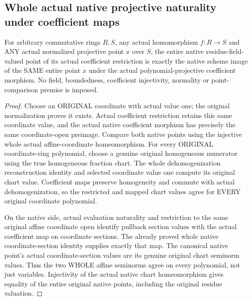\subsection{Whole actual native projective naturality under coefficient maps}

\begin{theorem}
\label{projective:actual-whole-native-coefficient-naturality}
\leanok
{}
For arbitrary commutative rings $R,S$, any actual homomorphism $f:R\to S$
and ANY actual normalized projective point $x$ over $S$, the entire native
residue-field-valued point of its actual coefficient restriction is exactly
the native scheme image of the SAME entire point $x$ under the actual
polynomial-projective coefficient morphism. No field, boundedness,
coefficient injectivity, normality or point-comparison premise is imposed.
\end{theorem}
\begin{proof}
Choose an ORIGINAL coordinate with actual value one; the original
normalization proves it exists. Actual coefficient restriction retains
this same coordinate value, and the actual native coefficient morphism
has precisely the same coordinate-open preimage. Compare both native
points using the injective whole actual affine-coordinate homeomorphism.
For every ORIGINAL coordinate-ring polynomial, choose a genuine original
homogeneous numerator using the true homogeneous fraction chart. The
whole dehomogenization reconstruction identity and selected coordinate
value one compute its original chart value. Coefficient maps preserve
homogeneity and commute with actual dehomogenization, so the restricted
and mapped chart values agree for EVERY original coordinate polynomial.

On the native side, actual evaluation naturality and restriction to the
same original affine coordinate open identify pullback section values
with the actual coefficient map on coordinate sections. The already
proved whole native coordinate-section identity supplies exactly that
map. The canonical native point's actual coordinate-section values are
its genuine original chart seminorm values. Thus the two WHOLE affine
seminorms agree on every polynomial, not just variables. Injectivity of
the actual native chart homeomorphism gives equality of the entire
original native points, including the original residue valuation.
\end{proof}


